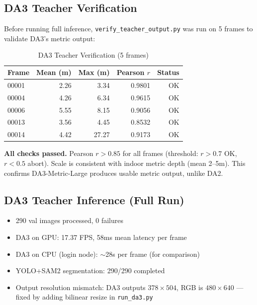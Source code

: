 \documentclass[11pt,a4paper]{article}
\begin{document}
\subsection{DA3 Teacher Verification}

Before running full inference, \texttt{verify\_teacher\_output.py}
was run on 5 frames to validate DA3's metric output:

\begin{table}[h]
\centering
\caption{DA3 Teacher Verification (5 frames)}
\label{tab:da3-verify}
\begin{tabular}{lrrrr}
\toprule
\textbf{Frame} & \textbf{Mean (m)} & \textbf{Max (m)} & \textbf{Pearson $r$} & \textbf{Status} \\
\midrule
00001 & 2.26  & 3.34  & 0.9801 & OK \\
00004 & 4.26  & 6.34  & 0.9615 & OK \\
00006 & 5.55  & 8.15  & 0.9056 & OK \\
00013 & 3.56  & 4.45  & 0.8532 & OK \\
00014 & 4.42  & 27.27 & 0.9173 & OK \\
\bottomrule
\end{tabular}
\end{table}

\textbf{All checks passed.} Pearson $r > 0.85$ for all frames (threshold:
$r > 0.7$ OK, $r < 0.5$ abort). Scale is consistent with indoor metric
depth (mean 2--5m). This confirms DA3-Metric-Large produces usable metric
output, unlike DA2.

\subsection{DA3 Teacher Inference (Full Run)}

\begin{itemize}[nosep]
  \item 290 val images processed, 0 failures
  \item DA3 on GPU: 17.37 FPS, 58ms mean latency per frame
  \item DA3 on CPU (login node): $\sim$28s per frame (for comparison)
  \item YOLO+SAM2 segmentation: 290/290 completed
  \item Output resolution mismatch: DA3 outputs $378 \times 504$,
    RGB is $480 \times 640$ --- fixed by adding bilinear resize in
    \texttt{run\_da3.py}
\end{itemize}

\end{document}

